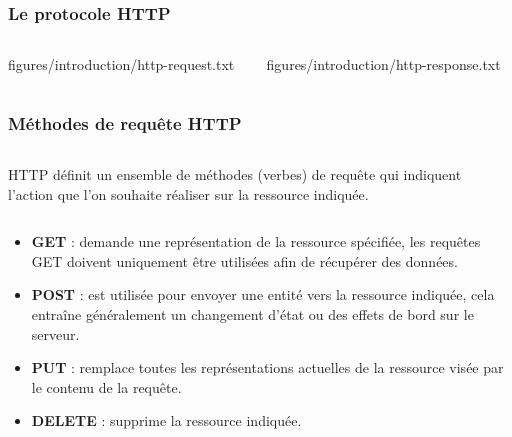 \begin{frame}
    \frametitle{Le protocole HTTP}

    \begin{columns}
        \begin{column}{0.5\textwidth}
            
            {figures/introduction/http-request.txt}
        \end{column}

        \begin{column}{0.5\textwidth}
            
            {figures/introduction/http-response.txt}
        \end{column}
    \end{columns}
\end{frame}

\begin{frame}
    \frametitle{Méthodes de requête HTTP}

    \begin{columns}
        \begin{column}{0.8\textwidth}
            HTTP définit un ensemble de méthodes (verbes) de requête qui indiquent l'action que l'on souhaite réaliser sur la ressource indiquée.
        \end{column}
        \begin{column}{0.2\textwidth}

        \end{column}
    \end{columns}

    \begin{itemize}
        \item \textbf{GET} : demande une représentation de la ressource spécifiée, les requêtes GET doivent uniquement être utilisées afin de récupérer des données.
        \item \textbf{POST} : est utilisée pour envoyer une entité vers la ressource indiquée, cela entraîne généralement un changement d'état ou des effets de bord sur le serveur.
        \item \textbf{PUT} : remplace toutes les représentations actuelles de la ressource visée par le contenu de la requête.
        \item \textbf{DELETE} : supprime la ressource indiquée.
    \end{itemize}
\end{frame}

